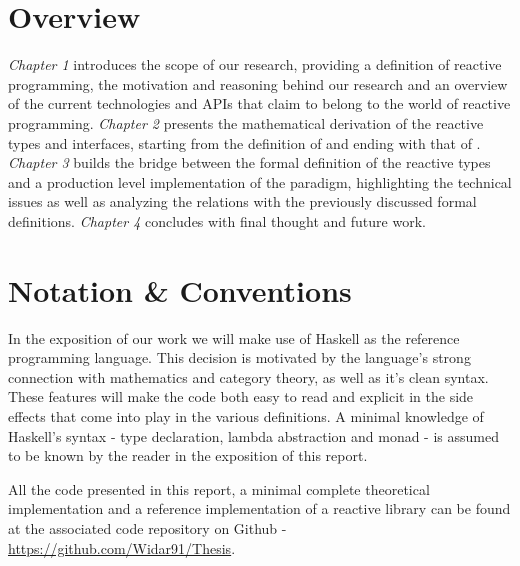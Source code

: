 \section*{Overview}

\textit{Chapter 1} introduces the scope of our research, providing a definition of reactive programming, the motivation and reasoning behind our research and an overview of the current technologies and APIs that claim to belong to the world of reactive programming. \textit{Chapter 2} presents the mathematical derivation of the reactive types and interfaces, starting from the definition of  and ending with that of . \textit{Chapter 3} builds the bridge between the formal definition of the reactive types and a production level implementation of the paradigm, highlighting the technical issues as well as analyzing the relations with the previously discussed formal definitions. \textit{Chapter 4} concludes with final thought and future work.

\section*{Notation \& Conventions}

In the exposition of our work we will make use of Haskell as the reference programming language. This decision is motivated by the language's strong connection with mathematics and category theory, as well as it's clean syntax. These features will make the code both easy to read and explicit in the side effects that come into play in the various definitions. A minimal knowledge of Haskell's syntax - type declaration, lambda abstraction and  monad - is assumed to be known by the reader in the exposition of this report. 

All the code presented in this report, a minimal complete theoretical implementation and a reference implementation of a reactive library can be found at the associated code repository on Github - \url{https://github.com/Widar91/Thesis}. 